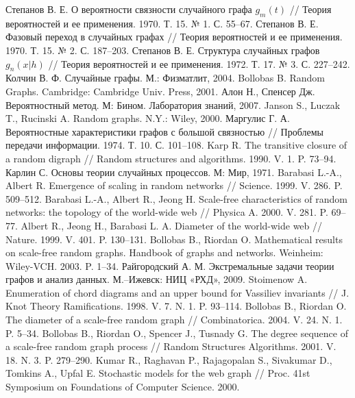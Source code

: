 \documentclass[14pt]{extreport}
\begin{document}

\begin{thebibliography}{9}

\bibitem{}
Степанов В. Е. О вероятности связности случайного графа $g_m(t)$ // Теория вероятностей и ее применения. 1970. Т. 15. № 1. С. 55–67.
\bibitem{}
Степанов В. Е. Фазовый переход в случайных графах // Теория вероятностей и ее применения. 1970. Т. 15. № 2. С. 187–203.
\bibitem{}
Степанов В. Е. Структура случайных графов $g_n(x|h)$ // Теория вероятностей и ее применения. 1972. Т. 17. № 3. С. 227–242.
\bibitem{}
Колчин В. Ф. Случайные графы. М.: Физматлит, 2004.
\bibitem{}
Bollobas B. Random Graphs. Cambridge: Cambridge Univ. Press, 2001.
\bibitem{}
Алон Н., Спенсер Дж. Вероятностный метод. М: Бином. Лаборатория знаний, 2007.
\bibitem{}
Janson S., Luczak T., Rucinski A. Random graphs. N.Y.: Wiley, 2000.
\bibitem{}
Маргулис Г. А. Вероятностные характеристики графов с большой связностью // Проблемы передачи информации. 1974. Т. 10. С. 101–108.
\bibitem{}
Karp R. The transitive closure of a random digraph // Random structures and algorithms. 1990. V. 1. P. 73–94.
\bibitem{}
Карлин С. Основы теории случайных процессов. М: Мир, 1971.
\bibitem{}
Barabasi L.-A., Albert R. Emergence of scaling in random networks // Science. 1999. V. 286. P. 509–512.
\bibitem{}
Barabasi L.-A., Albert R., Jeong H. Scale-free characteristics of random networks: the topology of the world-wide web // Physica A. 2000. V. 281. P. 69–77.
\bibitem{}
Albert R., Jeong H., Barabasi L. A. Diameter of the world-wide web // Nature. 1999. V. 401. P. 130–131.
\bibitem{}
Bollobas B., Riordan O. Mathematical results on scale-free random graphs. Handbook of graphs and networks. Weinheim: Wiley-VCH. 2003. P. 1–34.
\bibitem{}
Райгородский А. М. Экстремальные задачи теории графов и анализ данных. М.–Ижевск: НИЦ «РХД», 2009.
\bibitem{}
Stoimenow A. Enumeration of chord diagrams and an upper bound for Vassiliev invariants // J. Knot Theory Ramifications. 1998. V. 7. N. 1. P. 93–114.
\bibitem{}
Bollobas B., Riordan O. The diameter of a scale-free random graph // Combinatorica. 2004. V. 24. N. 1. P. 5–34.
\bibitem{}
Bollobas B., Riordan O., Spencer J., Tusnady G. The degree sequence of a scale-free random graph process // Random Structures Algorithms. 2001. V. 18. N. 3. P. 279–290.
\bibitem{}
Kumar R., Raghavan P., Rajagopalan S., Sivakumar D., Tomkins A., Upfal E. Stochastic models for the web graph // Proc. 41st Symposium on Foundations of Computer Science. 2000.

\end{thebibliography}
\newpage
\end{document}
